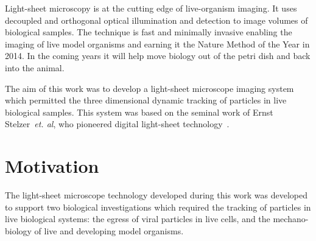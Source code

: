 
Light-sheet microscopy is at the cutting edge of live-organism imaging.
It uses decoupled and orthogonal optical illumination and detection to image volumes of biological samples.
The technique is fast and minimally invasive enabling the imaging of live model organisms and earning it the Nature Method of the Year in 2014.
In the coming years it will help move biology out of the petri dish and back into the animal.

The aim of this work was to develop a \gls{light-sheet} microscope imaging system which permitted the three dimensional dynamic tracking of particles in live biological samples.
This system was based on the seminal work of Ernst Stelzer~\emph{et. al}, who pioneered digital \gls{light-sheet} technology~\cite{huisken_optical_2004}.

\pagebreak

\section{Motivation}
The light-sheet microscope technology developed during this work was developed to support two biological investigations which required the tracking of particles in live biological systems: the egress of viral particles in live cells, and the mechano-biology of live and developing model organisms.

